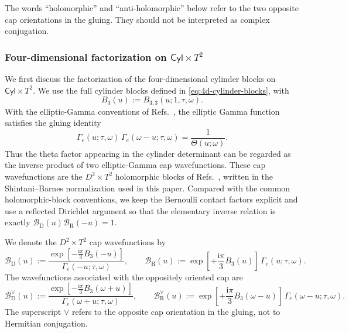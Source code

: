 \documentclass[11pt,a4paper]{article}
\numberwithin{equation}{section}
\theoremstyle{plain}
\theoremstyle{definition}
\theoremstyle{remark}
\newcommand{\ii}{\mathrm{i}}
\newcommand{\cyl}{\mathsf{Cyl}}
\begin{document}
The words ``holomorphic'' and ``anti-holomorphic'' below refer to the two opposite cap orientations in the gluing. They should not be interpreted as complex conjugation.


\subsubsection{Four-dimensional factorization on \texorpdfstring{\(\cyl\times T^2\)}{Cyl x T2}}

We first discuss the factorization of the four-dimensional cylinder blocks on
\(\cyl\times T^2\).  We use the full cylinder blocks defined in \eqref{eq:4d-cylinder-blocks}, with
\begin{equation}
B_3(u):=B_{3,3}(u;1,\tau,\omega).
\end{equation}
With the elliptic-Gamma conventions of Refs.~\cite{Felder:1999mq,Narukawa:2003,Friedman:2004}, the elliptic Gamma function satisfies the gluing identity
\begin{equation}
\Gamma_e(u;\tau,\omega)\,
\Gamma_e(\omega-u;\tau,\omega)
=
\frac{1}{\Theta(u;\omega)}.
\label{eq:gamma-theta-factorization}
\end{equation}
Thus the theta factor appearing in the cylinder determinant can be regarded as the inverse product of two elliptic-Gamma cap wavefunctions.  These cap wavefunctions are the \(D^2\times T^2\) holomorphic blocks of Refs.~\cite{Pasquetti:2011fj,Beem:2012mb,Nieri:2013yra,Nieri:2013vba,Nieri:2015yia,Longhi:2019hdh}, written in the Shintani--Barnes normalization used in this paper.  Compared with the common holomorphic-block conventions, we keep the Bernoulli contact factors explicit and use a reflected Dirichlet argument so that the elementary inverse relation is exactly \(\mathcal B_{\mathrm D}(u)\mathcal B_{\mathrm R}(-u)=1\).

We denote the \(D^2\times T^2\) cap wavefunctions by
\begin{equation}
\mathcal B_{\mathrm D}(u)
:=
\frac{
\exp\!\left[-\frac{\ii\pi}{3}B_3(-u)\right]
}{
\Gamma_e(-u;\tau,\omega)
},
\qquad
\mathcal B_{\mathrm R}(u)
:=
\exp\!\left[+\frac{\ii\pi}{3}B_3(u)\right]\,
\Gamma_e(u;\tau,\omega).
\label{eq:cap-wavefunctions-4d}
\end{equation}
The wavefunctions associated with the oppositely oriented cap are
\begin{equation}
\mathcal B_{\mathrm D}^{\vee}(u)
:=
\frac{
\exp\!\left[-\frac{\ii\pi}{3}B_3(\omega+u)\right]
}{
\Gamma_e(\omega+u;\tau,\omega)
},
\qquad
\mathcal B_{\mathrm R}^{\vee}(u)
:=
\exp\!\left[+\frac{\ii\pi}{3}B_3(\omega-u)\right]\,
\Gamma_e(\omega-u;\tau,\omega).
\label{eq:opposite-cap-wavefunctions-4d}
\end{equation}
The superscript \(\vee\) refers to the opposite cap orientation in the gluing, not to Hermitian conjugation.
\end{document}
